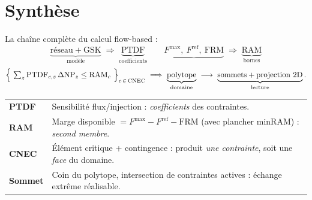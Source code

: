 \documentclass[11pt,a4paper]{article}
\newcommand{\NP}{\mathrm{NP}}
\newcommand{\PTDF}{\mathrm{PTDF}}
\newcommand{\RAM}{\mathrm{RAM}}
\newcommand{\Fmax}{F^{\max}}
\newcommand{\Fref}{F^{\mathrm{ref}}}
\newcommand{\FRM}{\mathrm{FRM}}
\newcommand{\GSK}{\mathrm{GSK}}
\begin{document}
\section{Synthèse}

La chaîne complète du calcul flow-based :
\[
  \underbrace{\text{réseau} + \GSK}_{\text{modèle}}
  \;\Rightarrow\;
  \underbrace{\PTDF}_{\text{coefficients}}
  \qquad
  \underbrace{\Fmax,\ \Fref,\ \FRM}_{}
  \;\Rightarrow\;
  \underbrace{\RAM}_{\text{bornes}}
\]
\[
  \Bigl\{\ \textstyle\sum_z \PTDF_{c,z}\,\Delta\NP_z \le \RAM_c
  \ \Bigr\}_{c\,\in\,\text{CNEC}}
  \;\Longrightarrow\;
  \underbrace{\text{polytope}}_{\text{domaine}}
  \;\longrightarrow\;
  \underbrace{\text{sommets} + \text{projection 2D}}_{\text{lecture}} .
\]

\begin{center}
\begin{tabular}{@{}p{2.4cm}p{12.6cm}@{}}
\toprule
\textbf{PTDF} & Sensibilité flux/injection : \emph{coefficients} des
contraintes. \\
\textbf{RAM} & Marge disponible $=\Fmax-\Fref-\FRM$ (avec plancher minRAM) :
\emph{second membre}. \\
\textbf{CNEC} & Élément critique + contingence : produit \emph{une contrainte},
soit une \emph{face} du domaine. \\
\textbf{Sommet} & Coin du polytope, intersection de contraintes actives :
échange extrême réalisable. \\
\bottomrule
\end{tabular}
\end{center}
\end{document}
